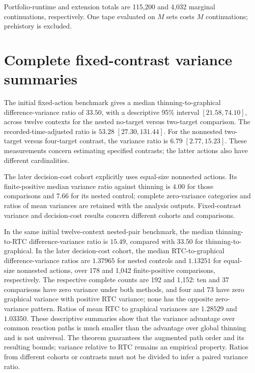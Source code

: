 \documentclass[preprint,11pt,sort&compress]{elsarticle}
\begin{document}
\endgroup
\noindent\footnotesize Portfolio-runtime and extension totals are 115,200 and 4,032 marginal continuations, respectively. One tape evaluated on $M$ sets costs $M$ continuations; prehistory is excluded.\normalsize

\FloatBarrier\section{Complete fixed-contrast variance summaries}
The initial fixed-action benchmark gives a median thinning-to-graphical difference-variance ratio of $33.50$, with a descriptive 95\% interval $[21.58,74.10]$, across twelve contexts for the nested no-target versus two-target comparison. The recorded-time-adjusted ratio is $53.28$ $[27.30,131.44]$. For the nonnested two-target versus four-target contrast, the variance ratio is $6.79$ $[2.77,15.23]$. These measurements concern estimating specified contrasts; the latter actions also have different cardinalities.

The later decision-cost cohort explicitly uses equal-size nonnested actions. Its finite-positive median variance ratio against thinning is $4.00$ for those comparisons and $7.66$ for its nested control; complete zero-variance categories and ratios of mean variances are retained with the analysis outputs. Fixed-contrast variance and decision-cost results concern different cohorts and comparisons.

In the same initial twelve-context nested-pair benchmark, the median thinning-to-RTC difference-variance ratio is $15.49$, compared with $33.50$ for thinning-to-graphical. In the later decision-cost cohort, the median RTC-to-graphical difference-variance ratios are $1.37965$ for nested controls and $1.13251$ for equal-size nonnested actions, over 178 and 1,042 finite-positive comparisons, respectively. The respective complete counts are 192 and 1,152: ten and 37 comparisons have zero variance under both methods, and four and 73 have zero graphical variance with positive RTC variance; none has the opposite zero-variance pattern. Ratios of mean RTC to graphical variances are $1.28529$ and $1.03350$. These descriptive summaries show that the variance advantage over common reaction paths is much smaller than the advantage over global thinning and is not universal. The theorem guarantees the augmented path order and its resulting bounds; variance relative to RTC remains an empirical property. Ratios from different cohorts or contrasts must not be divided to infer a paired variance ratio.
\end{document}
